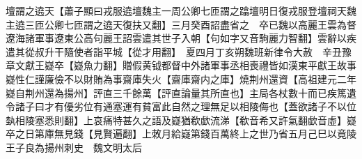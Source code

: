 壇謂之遶天【蕭子顯曰戎服遶壇魏主一周公卿七匝謂之蹹壇明日復戎服登壇祠天魏主遶三匝公卿七匝謂之遶天復扶又翻】三月癸酉詔盡省之　卒已魏以高麗王雲為督遼海諸軍事遼東公高句麗王詔雲遣其世子入朝【句如字又音駒麗力智翻】雲辭以疾遣其從叔升干隨使者詣平城【從才用翻】　夏四月丁亥朔魏班新律令大赦　辛丑豫章文獻王嶷卒【嶷魚力翻】贈假黄钺都督中外諸軍事丞相喪禮皆如漢東平獻王故事嶷性仁謹廉儉不以財賄為事齋庫失火【齋庫齋内之庫】燒荆州還資【高祖建元二年嶷自荆州還為揚州】評直三千餘萬【評直論量其所直也】主局各杖數十而已疾篤遺令諸子曰才有優劣位有通塞運有貧富此自然之理無足以相陵侮也【蓋欲諸子不以位埶相陵塞悉則翻】上哀痛特甚久之語及嶷猶欷歔流涕【欷音希又許氣翻歔音虛】嶷卒之日第庫無見錢【見賢遍翻】上敇月給嶷第錢百萬終上之世乃省五月己巳以竟陵王子良為揚州刺史　魏文明太后